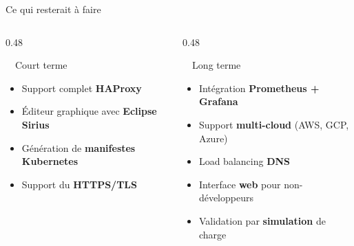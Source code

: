 \documentclass[aspectratio=169,12pt]{beamer}
\begin{document}
\begin{frame}{Ce qui resterait à faire}
\begin{columns}[T]
\begin{column}{0.48\textwidth}
\begin{block}{\faRoad\ \ Court terme}
\begin{itemize}
  \item Support complet \textbf{HAProxy}
  \item Éditeur graphique avec \textbf{Eclipse Sirius}
  \item Génération de \textbf{manifestes Kubernetes}
  \item Support du \textbf{HTTPS/TLS}
\end{itemize}
\end{block}
\end{column}
\begin{column}{0.48\textwidth}
\begin{block}{\faRocket\ \ Long terme}
\begin{itemize}
  \item Intégration \textbf{Prometheus + Grafana}
  \item Support \textbf{multi-cloud} (AWS, GCP, Azure)
  \item Load balancing \textbf{DNS}
  \item Interface \textbf{web} pour non-développeurs
  \item Validation par \textbf{simulation} de charge
\end{itemize}
\end{block}
\end{column}
\end{columns}

\vspace{0.8em}
\begin{center}
\end{center}
\end{frame}

\end{document}

